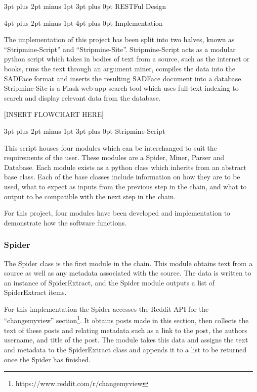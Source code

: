 \documentclass[12pt,a4paper]{article}
\makeatletter
\renewcommand\subsection{\@startsection {subsection}{1}{2mm} %
                               {3pt plus 2pt minus 1pt} %
                               {3pt plus 0pt} %
                               {\normalfont\bfseries}}
\renewcommand\section{\@startsection {section}{1}{0mm} %
                               {4pt plus 2pt minus 1pt} %
                               {4pt plus 0pt} %
                               {\bfseries}}
\makeatother
\begin{document}
\subsection{RESTFul Design}

\newpage
\section{Implementation}

The implementation of this project has been split into two halves, known as ``Stripmine-Script'' and ``Stripmine-Site''. Stripmine-Script acts as a modular python script which takes in bodies of text from a source, such as the internet or books, runs the text through an argument miner, compiles the data into the SADFace format and inserts the resulting SADFace document into a database. Stripmine-Site is a Flask web-app search tool which uses full-text indexing to search and display relevant data from the database.\newline

[INSERT FLOWCHART HERE]\newline

\subsection{Stripmine-Script}

This script houses four modules which can be interchanged to suit the requirements of the user. These modules are a Spider, Miner, Parser and Database. Each module exists as a python class which inherits from an abstract base class. Each of the base classes include information on how they are to be used, what to expect as inputs from the previous step in the chain, and what to output to be compatible with the next step in the chain. 

For this project, four modules have been developed and implementation to demonstrate how the software functions.

\subsubsection{Spider}

The Spider class is the first module in the chain. This module obtains text from a source as well as any metadata associated with the source. The data is written to an instance of SpiderExtract, and the Spider module outputs a list of SpiderExtract items.

For this implementation the Spider accesses the Reddit API for the ``changemyview'' section\footnote{https://www.reddit.com/r/changemyview}. It obtains posts made in this section, then collects the text of these posts and relating metadata such as a link to the post, the authors username, and title of the post. The module takes this data and assigns the text and metadata to the SpiderExtract class and appends it to a list to be returned once the Spider has finished. 
\end{document}
